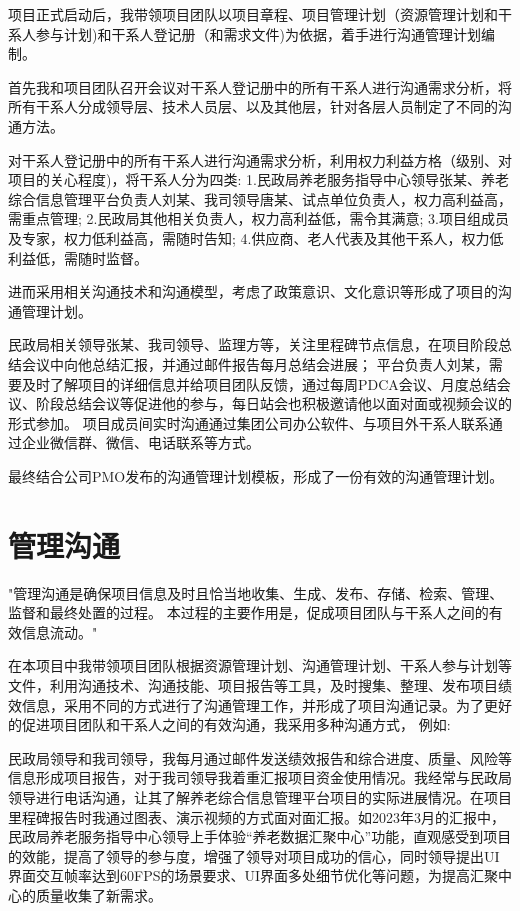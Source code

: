 \documentclass[UTF8]{../computerUniverse}
\begin{document}
项目正式启动后，我带领项目团队以项目章程、项目管理计划（资源管理计划和干系人参与计划)和干系人登记册（和需求文件)为依据，着手进行沟通管理计划编制。

首先我和项目团队召开会议对干系人登记册中的所有干系人进行沟通需求分析，将所有干系人分成领导层、技术人员层、以及其他层，针对各层人员制定了不同的沟通方法。

对干系人登记册中的所有干系人进行沟通需求分析，利用权力利益方格（级别、对项目的关心程度)，将干系人分为四类:
1.民政局养老服务指导中心领导张某、养老综合信息管理平台负责人刘某、我司领导唐某、试点单位负责人，权力高利益高，需重点管理;
2.民政局其他相关负责人，权力高利益低，需令其满意;
3.项目组成员及专家，权力低利益高，需随时告知;
4.供应商、老人代表及其他干系人，权力低利益低，需随时监督。

进而采用相关沟通技术和沟通模型，考虑了政策意识、文化意识等形成了项目的沟通管理计划。

民政局相关领导张某、我司领导、监理方等，关注里程碑节点信息，在项目阶段总结会议中向他总结汇报，并通过邮件报告每月总结会进展；
平台负责人刘某，需要及时了解项目的详细信息并给项目团队反馈，通过每周PDCA会议、月度总结会议、阶段总结会议等促进他的参与，每日站会也积极邀请他以面对面或视频会议的形式参加。
项目成员间实时沟通通过集团公司办公软件、与项目外干系人联系通过企业微信群、微信、电话联系等方式。

最终结合公司PMO发布的沟通管理计划模板，形成了一份有效的沟通管理计划。



\section{管理沟通}
"管理沟通是确保项目信息及时且恰当地收集、生成、发布、存储、检索、管理、监督和最终处置的过程。
本过程的主要作用是，促成项目团队与干系人之间的有效信息流动。"


在本项目中我带领项目团队根据资源管理计划、沟通管理计划、干系人参与计划等文件，利用沟通技术、沟通技能、项目报告等工具，及时搜集、整理、发布项目绩效信息，采用不同的方式进行了沟通管理工作，并形成了项目沟通记录。为了更好的促进项目团队和干系人之间的有效沟通，我采用多种沟通方式，
例如:


民政局领导和我司领导，我每月通过邮件发送绩效报告和综合进度、质量、风险等信息形成项目报告，对于我司领导我着重汇报项目资金使用情况。我经常与民政局领导进行电话沟通，让其了解养老综合信息管理平台项目的实际进展情况。在项目里程碑报告时我通过图表、演示视频的方式面对面汇报。如2023年3月的汇报中，民政局养老服务指导中心领导上手体验“养老数据汇聚中心”功能，直观感受到项目的效能，提高了领导的参与度，增强了领导对项目成功的信心，同时领导提出UI界面交互帧率达到60FPS的场景要求、UI界面多处细节优化等问题，为提高汇聚中心的质量收集了新需求。
\end{document}
